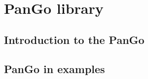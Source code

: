 
\section{PanGo library}
\label{pango}


\subsection{Introduction to the PanGo}

\subsection{PanGo in examples}
